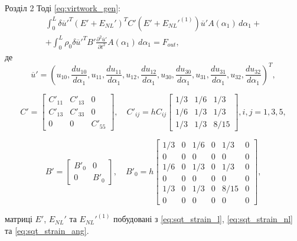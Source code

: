 \documentclass[8pt]{beamer}
\numberwithin{figure}{section}
\numberwithin{equation}{section}
\numberwithin{table}{section}
\begin{document}
\begin{frame}{Розділ 2}
Тоді \eqref{eq:virtwork_gen}:
\begin{multline}
\int_0^L \delta\overline{u}'^T \left( E' + E_{NL}' \right)^T C' \left( E' + E_{NL}'^{(1)} \right)\overline{u}' A\left(\alpha_1\right)\, d\alpha_1+\\+\int_0^L \rho_0 \delta\overline{u}'^T B'\frac{\partial^2 \overline{u}'}{\partial t^2} A\left(\alpha_1\right)\, d\alpha_1=F_{out},
\end{multline}
де
\[
\overline{u}' = \left( u_{10},
\frac { du_{10}} { d \alpha_1},
u_{11},
\frac { du_{11}} { d \alpha_1},
u_{12},
\frac { du_{12}} { d \alpha_1},
u_{30},
\frac { du_{30}} { d \alpha_1},
u_{31},
\frac { du_{31}} { d \alpha_1},
u_{32},
\frac { du_{32}} { d \alpha_1}
\right)^T,
\]


\[
C'=\left[
\begin{array}{ccc}
C'_{11} & C'_{13} & 0 \\ 
C'_{13} & C'_{33} & 0 \\ 
0 & 0 & C'_{55}
\end{array} 
\right], \quad 
C'_{ij}=hC_{ij}\left[
\begin{array}{ccc}
1/3 & 1/6 & 1/3 \\ 
1/6 & 1/3 & 1/3 \\ 
1/3 & 1/3 & 8/15
\end{array} 
\right], i,j=1,3,5,
\]

\[
B'=\left[
\begin{array}{cc}
B'_0 & 0 \\ 
0 & B'_0
\end{array} 
\right], \quad 
B'_0=h\left[
\begin{array}{cccccc}
1/3 & 0 & 1/6 & 0 & 1/3 & 0 \\ 
0 & 0 & 0 & 0 & 0 & 0 \\ 
1/6 & 0 & 1/3 & 0 & 1/3 & 0 \\ 
0 & 0 & 0 & 0 & 0 & 0 \\ 
1/3 & 0 & 1/3 & 0 & 8/15 & 0\\
0 & 0 & 0 & 0 & 0 & 0 
\end{array} 
\right],
\]

матриці $E'$, $E_{NL}'$ та $E_{NL}'^{(1)}$ побудовані з \eqref{eq:sqt_strain_l}, \eqref{eq:sqt_strain_nl} та \eqref{eq:sqt_strain_ang}.

\end{frame}
\end{document}
